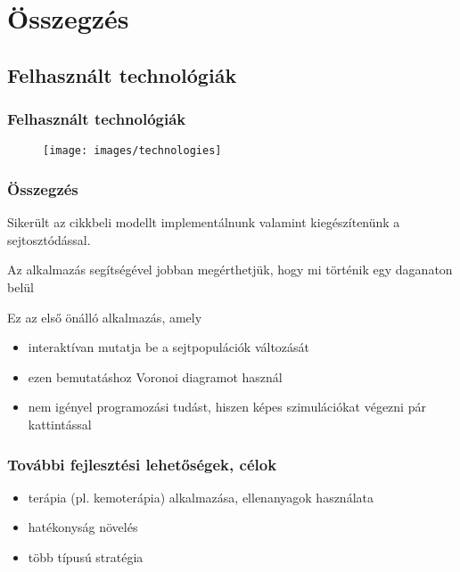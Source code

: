 \section{Összegzés}

\subsection{Felhasznált technológiák}
\begin{frame}
	\frametitle{Felhasznált technológiák}
	\begin{figure}[ht!]
		\centering
		\texttt{[image: images/technologies]}
	\end{figure}
\end{frame}

\begin{frame}
\frametitle{Összegzés}

\begin{block}{}
Sikerült az \cite{archetti2016cooperation} cikkbeli modellt implementálnunk valamint kiegészítenünk a sejtosztódással.
\end{block}
\begin{block}{}
Az alkalmazás segítségével jobban megérthetjük, hogy mi történik egy daganaton belül
\end{block}

\pause
\begin{block}{Ez az első önálló alkalmazás, amely}
\begin{itemize}
	\item interaktívan mutatja be a sejtpopulációk változását
	\pause
	\item ezen bemutatáshoz Voronoi diagramot használ
	\pause
	\item nem igényel programozási tudást, hiszen képes szimulációkat végezni pár kattintással
\end{itemize}
\end{block}
\end{frame}

\begin{frame}
\frametitle{További fejlesztési lehetőségek, célok}
\begin{itemize}
	\item terápia (pl. kemoterápia) alkalmazása, ellenanyagok használata
	\item hatékonyság növelés
	\item több típusú stratégia
\end{itemize}

\end{frame}